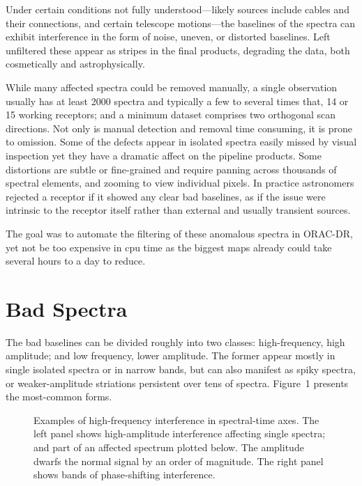 Under certain conditions not fully understood---likely sources include cables and their connections, and certain telescope motions---the baselines of the spectra can exhibit interference in the form of noise, uneven, or distorted baselines.  Left unfiltered these appear as stripes in the final products, degrading the data, both cosmetically and astrophysically.

While many affected spectra could be removed manually, a single observation usually has at least 2000 spectra and typically a few to several times that, 14 or 15 working receptors; and a minimum dataset comprises two orthogonal scan directions.  Not only is manual detection and removal time consuming, it is prone to omission.  Some of the defects appear in isolated spectra easily missed by visual inspection yet they have a dramatic affect on the pipeline products.  Some distortions are subtle or fine-grained and require panning across thousands of spectral elements, and zooming to view individual pixels. In practice astronomers rejected a receptor if it showed any clear bad baselines, as if the issue were intrinsic to the receptor itself rather than external and usually transient sources.

The goal was to automate the filtering of these anomalous spectra in ORAC-DR, yet not be too expensive in cpu time as the biggest maps already could take several hours to a day to reduce.

\section{Bad Spectra}

The bad baselines can be divided roughly into two classes: high-frequency, high amplitude; and low frequency, lower amplitude. The former appear mostly in single isolated spectra or in narrow bands, but can also manifest as spiky spectra, or weaker-amplitude striations persistent over tens of spectra.  Figure~1 presents the most-common forms.

\begin{figure}[!ht]
\caption{Examples of high-frequency interference in spectral-time axes. The left panel shows high-amplitude interference affecting single spectra; and part of an affected spectrum plotted below. The amplitude dwarfs the normal signal by an order of magnitude. The right panel shows bands of phase-shifting interference.}
\end{figure}

